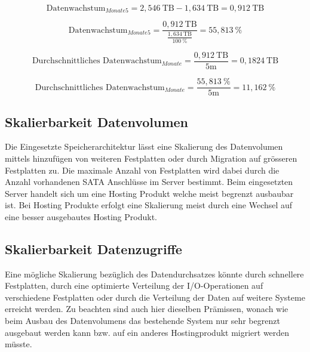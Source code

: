 \begin{equation}
\mbox{Datenwachstum}_{Monate5} = 2,546  \mathrm{\ TB} - 1,634 \mathrm{\ TB} =  0,912 \mathrm{\ TB}
\label{eqn:Verfügbarkeit_5Monate}
\end{equation}

\begin{equation}
\mbox{Datenwachstum}_{Monate5} = \frac{0,912 \mathrm{\ TB}}{\frac{1,634 \mathrm{\ TB}}{100 \ \%}} =  55,813 \ \%
\label{eqn:Verfügbarkeit_5Monate_in_Prozent}
\end{equation}

\begin{equation}
\mbox{Durchschnittliches Datenwachstum}_{Monate} = \frac{0,912 \mathrm{\ TB}}{5\mathrm{m}} =  0,1824 \mathrm{\ TB}
\label{eqn:Verfügbarkeit_1Monate}
\end{equation}

\begin{equation}
\mbox{Durchschnittliches Datenwachstum}_{Monate} = \frac{55,813\ \%}{5 \mathrm{m}} = 11,162 \ \%
\label{eqn:Verfügbarkeit_1Monate_in_Prozent}
\end{equation}

\subsection{Skalierbarkeit Datenvolumen}\label{AnalyseSkalierbarkeitDatenvolumen}
Die Eingesetzte Speicherarchitektur lässt eine Skalierung des Datenvolumen mittels hinzufügen von weiteren Festplatten oder durch Migration auf grösseren Festplatten zu. Die maximale Anzahl von Festplatten wird dabei durch die Anzahl vorhandenen SATA Anschlüsse im Server bestimmt. Beim eingesetzten Server handelt sich um eine Hosting Produkt welche meist begrenzt ausbaubar ist. Bei Hosting Produkte erfolgt eine Skalierung meist durch eine Wechsel auf eine besser ausgebautes Hosting Produkt. 

\subsection{Skalierbarkeit Datenzugriffe}
Eine mögliche Skalierung bezüglich des Datendurchsatzes könnte durch schnellere Festplatten, durch eine optimierte Verteilung der I/O-Operationen auf verschiedene Festplatten oder durch die Verteilung der Daten auf weitere Systeme erreicht werden. Zu beachten sind auch hier dieselben Prämissen, wonach wie beim Ausbau des Datenvolumens das bestehende System nur sehr begrenzt ausgebaut werden kann bzw. auf ein anderes Hostingprodukt migriert werden müsste.

